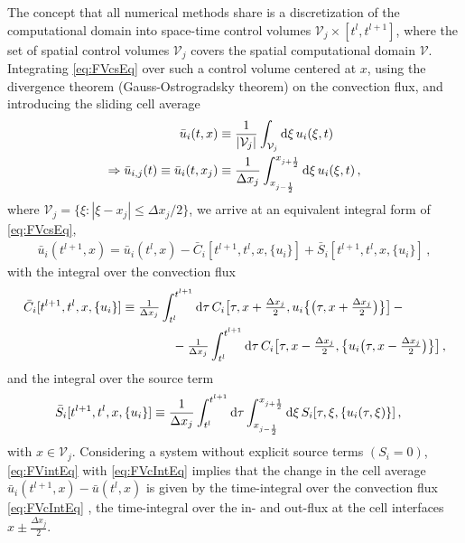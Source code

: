 The concept that all numerical \fv{} methods share is a discretization of the computational domain into space-time control volumes $\mathcal{V}_j \times [ t^l, t^{l+1} ]$, where the set of spatial control volumes $\mathcal{V}_j$ covers the spatial computational domain $\mathcal{V}$.
Integrating \cref{eq:FVcsEq} over such a control volume centered at $x$, using the divergence theorem (Gauss-Ostrogradsky theorem) on the convection flux, and introducing the sliding cell average
\begin{align}
	\bar{u}_{i} ( t, x ) &\equiv \frac{1}{| \mathcal{V}_j |} \int_{\mathcal{V}_j} \dif\xi \, u_i( \xi, t )\\
	\Rightarrow \bar{u}_{i,j}(t)\equiv \bar{u}_{i} ( t, x_j ) &\equiv \frac{1}{\Delta x_j} \int_{x_{j-\frac{1}{2}}}^{x_{j+\frac{1}{2}}} \dif\xi \, u_i( \xi, t )\, ,\label{eq:FVaverage}
\end{align}
where $\mathcal{V}_j = \{ \xi : | \xi - x_j | \leq \Delta x_j/2 \}$, we arrive at an equivalent integral form of \cref{eq:FVcsEq},
\begin{align}
	\bar{u}_i ( t^{l+1}, x ) = \bar{u}_i ( t^l, x ) - \bar{C}_i[ t^{l+1},t^l, x,\{u_i\} ] + \bar{S}_i[ t^{l+1},t^l, x,\{u_i\} ]\label{eq:FVintEq}\,,
\end{align}
with the integral over the convection flux 
\begin{align}
	\bar{C}_i[ t^{l+1},t^l, x,\{u_i\} ]&\equiv \tfrac{1}{\Delta x_j}\int_{t^l}^{t^{l+1}} \dif\tau \, C_i \big[ \tau, x + \tfrac{\Delta x_j}{2}, u_i \big\{ \big( \tau, x + \tfrac{\Delta x_j}{2} \big) \big\} \big]\, -\notag\\* %
	&\qquad\qquad-\tfrac{1}{\Delta x_j}\int_{t^l}^{t^{l+1}} \dif\tau \, C_i \big[ \tau, x - \tfrac{\Delta x_j}{2},  \big\{u_i \big( \tau, x - \tfrac{\Delta x_j}{2} \big)  \big\}\big]\,,\label{eq:FVcIntEq}
\end{align}
and the integral over the source term
\begin{align}
	\bar{S}_i[ t^{l+1},t^l, x,\{u_i\} ]&\equiv \frac{1}{\Delta x_j}  \int_{t^l}^{t^{l+1}} \dif\tau \int_{x_{j-\frac{1}{2}}}^{x_{j+\frac{1}{2}}} \dif\xi \, S_i [ \tau, \xi, \{u_i ( \tau, \xi )\} ] \,,\label{eq:FVsIntEq}
\end{align}
with $x\in\mathcal{V}_j$.
Considering a system without explicit source terms $(S_i=0)$, \cref{eq:FVintEq} with \cref{eq:FVcIntEq} implies that the change in the cell average $\bar{u}_i ( t^{l+1}, x )-\bar{u} ( t^l, x )$ is given by the time-integral over the convection flux \eqref{eq:FVcIntEq} \dash{} \ie{}, the time-integral over the in- and out-flux at the cell interfaces $x\pm\frac{\Delta x_j}{2}$.

